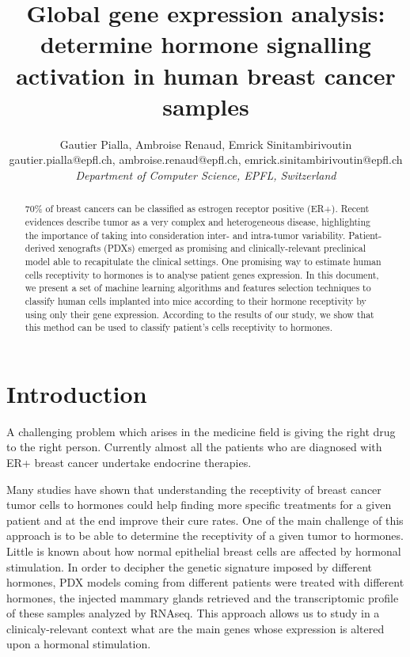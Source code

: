 \documentclass[10pt,conference,compsocconf]{IEEEtran}
\begin{document}
\title{Global gene expression analysis: determine hormone signalling activation in human breast cancer samples}

\author{
  Gautier Pialla, Ambroise Renaud, Emrick Sinitambirivoutin\\
  gautier.pialla@epfl.ch, ambroise.renaud@epfl.ch, emrick.sinitambirivoutin@epfl.ch\\
  \textit{Department of Computer Science, EPFL, Switzerland}
}

\maketitle
\begin{abstract}

70\% of breast cancers can be classified as estrogen receptor positive (ER+). Recent evidences describe tumor as a very complex and heterogeneous disease, highlighting the importance of taking into consideration inter- and intra-tumor variability. Patient-derived xenografts (PDXs) emerged as promising and clinically-relevant preclinical model able to recapitulate the clinical settings.
One promising way to estimate human cells receptivity to hormones is to analyse patient genes expression.
In this document, we present a set of machine learning algorithms and features selection techniques to classify human cells implanted into mice according to their hormone receptivity by using only their gene expression.
According to the results of our study, we show that this method can be used to classify patient's cells receptivity to hormones.



\end{abstract}



\section{Introduction}
A challenging problem which arises in the medicine field is giving the right drug to the right person.
Currently almost all the patients who are diagnosed with ER+ breast cancer undertake endocrine therapies. 

Many studies have shown that understanding the receptivity of breast cancer tumor cells to hormones could help finding more specific treatments for a given patient and at the end improve their cure rates. One of the main challenge of this approach is to be able to determine the receptivity of a given tumor to hormones. 
Little is known about how normal epithelial breast cells are affected by hormonal stimulation. In order to decipher the genetic signature imposed by different hormones, PDX models coming from different patients were treated with different hormones, the injected mammary glands retrieved and the transcriptomic profile of these samples analyzed by RNAseq. This approach allows us to study in a clinicaly-relevant context what are the main genes whose expression is altered upon a hormonal stimulation. 
\end{document}
